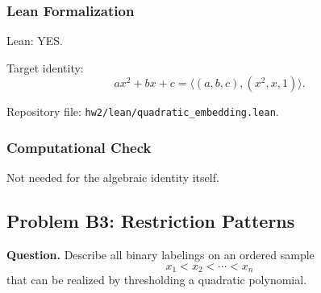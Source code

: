 \documentclass{article}
\begin{document}
\begin{solutionbox}
\subsubsection{Lean Formalization}

Lean: YES.

Target identity:
\[
a x^2+b x+c=\langle (a,b,c),(x^2,x,1)\rangle.
\]

Repository file:
\texttt{hw2/lean/quadratic\_embedding.lean}.

\subsubsection{Computational Check}

Not needed for the algebraic identity itself.

\end{solutionbox}

\subsection{Problem B3: Restriction Patterns}

\textbf{Question.}
\newline
Describe all binary labelings on an ordered sample
\[
x_1<x_2<\cdots<x_n
\]
that can be realized by thresholding a quadratic polynomial.
\end{document}
